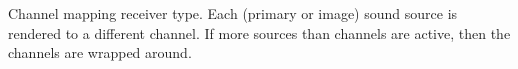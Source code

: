 Channel mapping receiver type. Each (primary or image) sound source is
rendered to a different channel. If more sources than channels are
active, then the channels are wrapped around.


